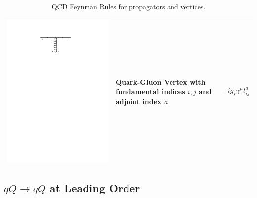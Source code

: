 \begin{table}[h!]
\begin{tabular}{ | c | m{5cm} | m{5cm} | }
\begin{minipage}{.3\textwidth}
      \includegraphics[scale=0.7]{Images/qg_vert.pdf}
    \end{minipage}
    \hspace{2pt}
    &
    Quark-Gluon Vertex with fundamental indices $i,j$ and adjoint index $a$
    & 
    \begin{minipage}{5cm}
    \centering
     $$  -i g_s \gamma^\mu t^a_{ij}$$
    \end{minipage}
    \\ [\VSpace]

    \hline
  \end{tabular}
  \caption{QCD Feynman Rules for propagators and vertices.}\label{tab:QCD}
\end{table}

\subsection{$qQ \to qQ$ at Leading Order}

